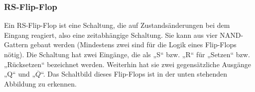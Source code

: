   \subsubsection{RS-Flip-Flop}
     Ein RS-Flip-Flop ist eine Schaltung, die auf Zustandsänderungen bei dem Eingang reagiert,
     also eine zeitabhängige Schaltung. 
     Sie kann aus vier NAND-Gattern gebaut werden 
     (Mindestens zwei sind für die Logik eines Flip-Flops nötig). 
     Die Schaltung hat zwei Eingänge, die als „S“ bzw. „R“ für „Setzen“ bzw. „Rücksetzen“ bezeichnet werden. 
     Weiterhin hat sie zwei gegensätzliche Ausgänge „Q“ und „$\overline{Q}$“. Das Schaltbild dieses Flip-Flops ist in der unten stehenden Abbildung zu erkennen.

